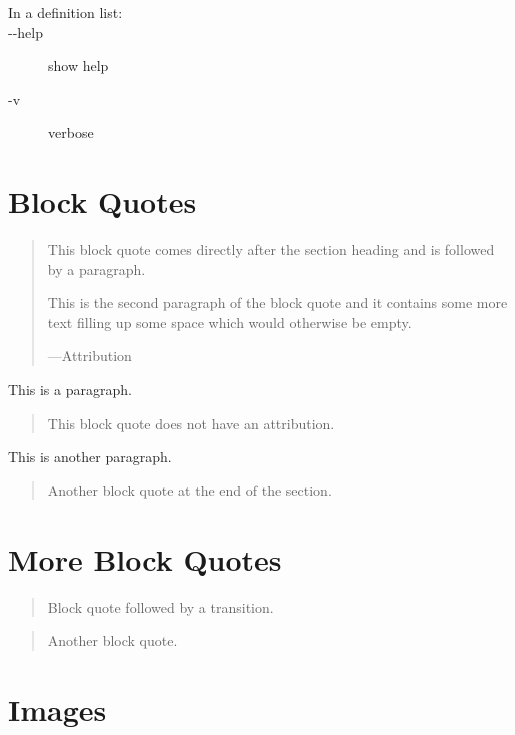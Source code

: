 \documentclass[a4paper]{article}
\providecommand*{\DUoptionlistlabel}[1]{\bfseries #1 \hfill}
\newenvironment{DUoptionlist}{%
    \list{}{\setlength{\labelwidth}{\DUoptionlistindent}
            \setlength{\rightmargin}{1cm}
            \setlength{\leftmargin}{\rightmargin}
            \addtolength{\leftmargin}{\labelwidth}
            \addtolength{\leftmargin}{\labelsep}
            \renewcommand{\makelabel}{\DUoptionlistlabel}}
  }
  {\endlist}
\providecommand*{\DUtransition}{%
  \hspace*{\fill}\hrulefill\hspace*{\fill}
  \vskip 0.5\baselineskip
}
\begin{document}
\begin{description}
\item[{In a definition list:}] \leavevmode
\begin{DUoptionlist}
\item[-{}-help]  show help

\item[-v]  verbose
\end{DUoptionlist}
\end{description}


\section{Block Quotes%
  \label{block-quotes}%
}

\begin{quote}
This block quote comes directly after the section heading and is
followed by a paragraph.

This is the second paragraph of the block quote and it contains
some more text filling up some space which would otherwise be
empty.
\nopagebreak

\raggedleft —Attribution
\end{quote}

This is a paragraph.

\begin{quote}
This block quote does not have an attribution.
\end{quote}

This is another paragraph.

\begin{quote}
Another block quote at the end of the section.
\end{quote}


\section{More Block Quotes%
  \label{more-block-quotes}%
}

\begin{quote}
Block quote followed by a transition.
\end{quote}

\DUtransition

\begin{quote}
Another block quote.
\end{quote}


\section{Images%
  \label{images}%
}
\end{document}
